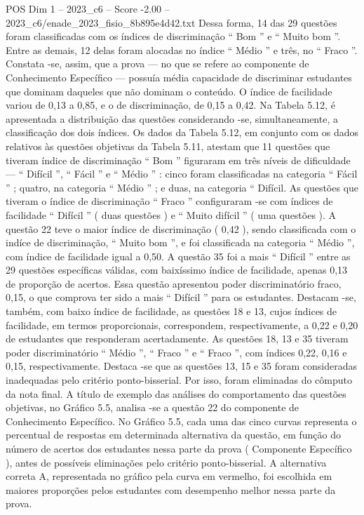 \begin{textsample}{POS Dim 1 – 2023\_c6 – Score -2.00 – 2023\_c6/enade\_2023\_fisio\_8b895e4d42.txt}
Dessa forma, 14 das 29 questões foram classificadas com os índices de discriminação “ Bom ” e “ Muito bom ”.
Entre as demais, 12 delas foram alocadas no índice “ Médio ” e três, no “ Fraco ”.
Constata -se, assim, que a prova — no que se refere ao componente de Conhecimento Específico — possuía média capacidade de discriminar estudantes que dominam daqueles que não dominam o conteúdo.
O índice de facilidade variou de 0,13 a 0,85, e o de discriminação, de 0,15 a 0,42.
Na Tabela 5.12, é apresentada a distribuição das questões considerando -se, simultaneamente, a classificação dos dois índices.
Os dados da Tabela 5.12, em conjunto com os dados relativos às questões objetivas da Tabela 5.11, atestam que 11 questões que tiveram índice de discriminação “ Bom ” figuraram em três níveis de dificuldade — “ Difícil ”, “ Fácil ” e “ Médio ” : cinco foram classificadas na categoria “ Fácil ” ; quatro, na categoria “ Médio ” ; e duas, na categoria “ Difícil.
As questões que tiveram o índice de discriminação “ Fraco ” configuraram -se com índices de facilidade “ Difícil ” ( duas questões ) e “ Muito difícil ” ( uma questões ).
A questão 22 teve o maior índice de discriminação ( 0,42 ), sendo classificada com o indíce de discriminação, “ Muito bom ”, e foi classificada na categoria “ Médio ”, com índice de facilidade igual a 0,50.
A questão 35 foi a mais “ Difícil ” entre as 29 questões específicas válidas, com baixíssimo índice de facilidade, apenas 0,13 de proporção de acertos.
Essa questão apresentou poder discriminatório fraco, 0,15, o que comprova ter sido a mais “ Difícil ” para os estudantes.
Destacam -se, também, com baixo índice de facilidade, as questões 18 e 13, cujos índices de facilidade, em termos proporcionais, correspondem, respectivamente, a 0,22 e 0,20 de estudantes que responderam acertadamente.
As questões 18, 13 e 35 tiveram poder discriminatório “ Médio ”, “ Fraco ” e “ Fraco ”, com índices 0,22, 0,16 e 0,15, respectivamente.
Destaca -se que as questões 13, 15 e 35 foram consideradas inadequadas pelo critério ponto-bisserial.
Por isso, foram eliminadas do cômputo da nota final.
A título de exemplo das análises do comportamento das questões objetivas, no Gráfico 5.5, analisa -se a questão 22 do componente de Conhecimento Específico.
No Gráfico 5.5, cada uma das cinco curvas representa o percentual de respostas em determinada alternativa da questão, em função do número de acertos dos estudantes nessa parte da prova ( Componente Específico ), antes de possíveis eliminações pelo critério ponto-bisserial.
A alternativa correta A, representada no gráfico pela curva em vermelho, foi escolhida em maiores proporções pelos estudantes com desempenho melhor nessa parte da prova.

\end{textsample}
